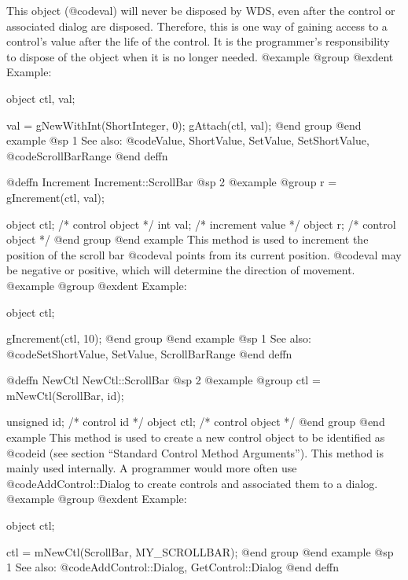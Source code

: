 This object (@code{val}) will never be disposed by WDS, even after
the control or associated dialog are disposed.  Therefore, this
is one way of gaining access to a control's value after the life
of the control.  It is the programmer's responsibility to dispose of
the object when it is no longer needed.
@example
@group
@exdent Example:

object  ctl, val;

val = gNewWithInt(ShortInteger, 0);
gAttach(ctl, val);
@end group
@end example
@sp 1
See also:  @code{Value, ShortValue, SetValue, SetShortValue,}
        @code{ScrollBarRange}
@end deffn










@deffn {Increment} Increment::ScrollBar
@sp 2
@example
@group
r = gIncrement(ctl, val);

object  ctl;   /*  control object  */
int     val;   /*  increment value */
object  r;     /*  control object  */
@end group
@end example
This method is used to increment the position of the scroll bar
@code{val} points from its current position.  @code{val} may
be negative or positive, which will determine the direction of movement.
@example
@group
@exdent Example:

object  ctl;

gIncrement(ctl, 10);
@end group
@end example
@sp 1
See also:  @code{SetShortValue, SetValue, ScrollBarRange}
@end deffn











@deffn {NewCtl} NewCtl::ScrollBar
@sp 2
@example
@group
ctl = mNewCtl(ScrollBar, id);

unsigned  id;   /*  control id      */
object   ctl;   /*  control object  */
@end group
@end example
This method is used to create a new control object to be identified as
@code{id} (see section ``Standard Control Method Arguments'').  This
method is mainly used internally.  A programmer would more often
use @code{AddControl::Dialog} to create controls and associated them
to a dialog.
@example
@group
@exdent Example:

object  ctl;

ctl = mNewCtl(ScrollBar, MY_SCROLLBAR);
@end group
@end example
@sp 1
See also:  @code{AddControl::Dialog, GetControl::Dialog}
@end deffn






